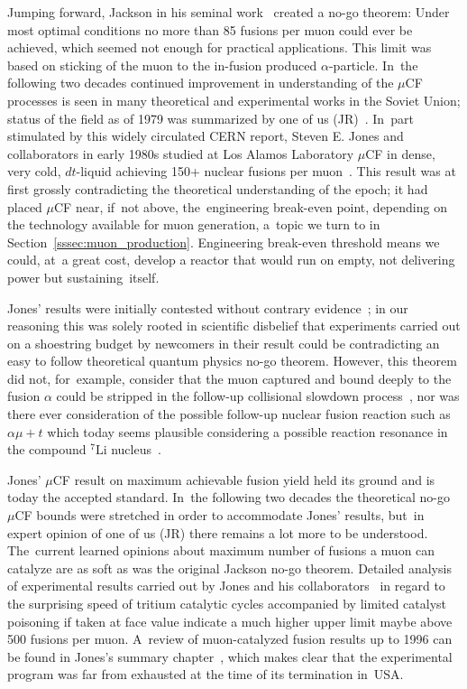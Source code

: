\documentclass[particles,article,accept,pdftex,moreauthors]{Definitions/mdpi}
\begin{document}
Jumping forward, Jackson in his seminal work~\cite{Jackson:1957zza} created a no-go theorem: Under most optimal conditions no more than 85 fusions per muon could ever be achieved, which seemed not enough for practical applications. This limit was based on sticking of the muon to the in-fusion produced $\alpha$-particle. In~the following two decades continued improvement in understanding of the $\mu$CF processes is seen in many theoretical and experimental works in the Soviet Union; status of the field as of 1979 was summarized by one of us (JR)~\cite{Rafelski:1979ab}. In~part stimulated by this widely circulated CERN report, Steven E. Jones and collaborators in early 1980s studied at Los Alamos Laboratory $\mu$CF in dense, very cold, $dt$-liquid achieving 150+ nuclear fusions per muon~\cite{Jones:1983pw,Jones:1986kk,Jones:1986Na}. This result was at first grossly contradicting the theoretical understanding of the epoch; it had placed $\mu$CF near, if~not above, the~engineering break-even point, depending on the technology available for muon generation, a~topic we turn to in Section~\ref{sssec:muon_production}. Engineering break-even threshold means we could, at~a great cost, develop a reactor that would run on empty, not delivering power but sustaining~itself.

Jones' results were initially contested without contrary evidence~\cite{jones1993evaluation}; in our reasoning this was solely rooted in scientific disbelief that experiments carried out on a shoestring budget by newcomers in their result could be contradicting an easy to follow theoretical quantum physics no-go theorem. However, this theorem did not, for~example, consider that the muon captured and bound deeply to the fusion $\alpha$ could be stripped in the follow-up collisional slowdown process~\cite{Rafelski:1988wq}, nor was there ever consideration of the possible follow-up nuclear fusion reaction such as $\alpha\mu+t$ which today seems plausible considering a possible reaction resonance in the compound ${}^7\mathrm{Li}$ nucleus~\cite{Aprahamian:2025AA}. 

Jones' $\mu$CF result on maximum achievable fusion yield held its ground and is today the accepted standard. In~the following two decades the theoretical no-go $\mu$CF bounds were stretched in order to accommodate Jones' results, but~in expert opinion of one of us (JR) there remains a lot more to be understood. The~current learned opinions about maximum number of fusions a muon can catalyze are as soft as was the original Jackson no-go theorem. Detailed analysis of experimental results carried out by Jones and his collaborators~\cite{jones1993evaluation} in regard to the surprising speed of tritium catalytic cycles accompanied by limited catalyst poisoning if taken at face value indicate a much higher upper limit maybe above 500 fusions per muon. A~review of muon-catalyzed fusion results up to 1996 can be found in Jones's summary chapter~\cite{Jones1997}, which makes clear that the experimental program was far from exhausted at the time of its termination in~USA. 
\end{document}
